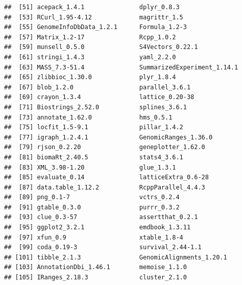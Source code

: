 \documentclass[10pt,]{article}
\begin{document}
\begin{verbatim}
##  [51] acepack_1.4.1               dplyr_0.8.3                
##  [53] RCurl_1.95-4.12             magrittr_1.5               
##  [55] GenomeInfoDbData_1.2.1      Formula_1.2-3              
##  [57] Matrix_1.2-17               Rcpp_1.0.2                 
##  [59] munsell_0.5.0               S4Vectors_0.22.1           
##  [61] stringi_1.4.3               yaml_2.2.0                 
##  [63] MASS_7.3-51.4               SummarizedExperiment_1.14.1
##  [65] zlibbioc_1.30.0             plyr_1.8.4                 
##  [67] blob_1.2.0                  parallel_3.6.1             
##  [69] crayon_1.3.4                lattice_0.20-38            
##  [71] Biostrings_2.52.0           splines_3.6.1              
##  [73] annotate_1.62.0             hms_0.5.1                  
##  [75] locfit_1.5-9.1              pillar_1.4.2               
##  [77] igraph_1.2.4.1              GenomicRanges_1.36.0       
##  [79] rjson_0.2.20                geneplotter_1.62.0         
##  [81] biomaRt_2.40.5              stats4_3.6.1               
##  [83] XML_3.98-1.20               glue_1.3.1                 
##  [85] evaluate_0.14               latticeExtra_0.6-28        
##  [87] data.table_1.12.2           RcppParallel_4.4.3         
##  [89] png_0.1-7                   vctrs_0.2.4                
##  [91] gtable_0.3.0                purrr_0.3.2                
##  [93] clue_0.3-57                 assertthat_0.2.1           
##  [95] ggplot2_3.2.1               emdbook_1.3.11             
##  [97] xfun_0.9                    xtable_1.8-4               
##  [99] coda_0.19-3                 survival_2.44-1.1          
## [101] tibble_2.1.3                GenomicAlignments_1.20.1   
## [103] AnnotationDbi_1.46.1        memoise_1.1.0              
## [105] IRanges_2.18.3              cluster_2.1.0
\end{verbatim}

\printbibliography
\end{document}
